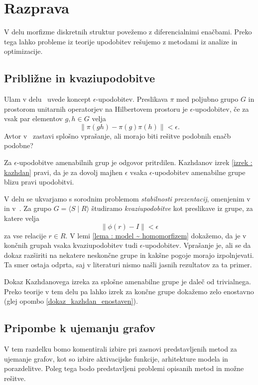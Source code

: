 \documentclass[mat2, tisk]{fmfdelo}
\begin{document}
\section{Razprava}
V delu morfizme diskretnih struktur povežemo z diferencialnimi
enačbami. Preko tega lahko probleme iz teorije upodobitev
rešujemo z metodami iz analize in optimizacije.
\subsection{Približne in kvaziupodobitve}
Ulam v delu~\cite{ulam1960collection} uvede koncept
$\epsilon$-upodobitev. Preslikava $\pi$ med poljubno grupo $G$ in
prostorom unitarnih operatorjev na Hilbertovem prostoru  je
$\epsilon$-upodobitev, če za vsak par elementov $g, h \in G$ velja
$$
\| \pi(gh) -\pi(g)\pi(h)  \| < \epsilon.
$$
Avtor v~\cite[stran 63]{ulam1960collection}
zastavi splošno vprašanje, ali morajo biti rešitve
podobnih enačb podobne?

Za $\epsilon$-upodobitve amenabilnih grup je odgovor pritrdilen.
Kazhdanov izrek \ref{izrek : kazhdan} pravi,
da je za dovolj majhen $\epsilon$ vsaka
$\epsilon$-upodobitev amenabilne grupe blizu pravi upodobitvi.

V delu se ukvarjamo s sorodnim problemom \emph{stabilnosti prezentacij},
omenjenim v
\cite{chapman2023efficientlystablepresentationserrorcorrecting}
in v~\cite{willett2024conditionalrepresentationstabilityclassification}.
Za grupo $G = \langle S \mid R \rangle$ študiramo
\emph{kvaziupodobitve} kot preslikave iz grupe, za katere velja
$$
\left\| \phi(r) - I  \right\| < \epsilon
$$ za
vse relacije $r \in R$.
V lemi \ref{lema : model ~ homomorfizem} dokažemo, da je v
končnih grupah vsaka kvaziupodobitev tudi $\epsilon$-upodobitev.
Vprašanje je, ali se da dokaz razširiti na nekatere neskončne
grupe in kakšne pogoje morajo izpolnjevati.
Ta smer ostaja odprta, saj v literaturi nismo našli jasnih rezultatov
za ta primer.

Dokaz Kazhdanovega izreka za splošne amenabilne grupe je daleč od trivialnega.
Preko teorije v tem delu pa lahko izrek za končne grupe dokažemo zelo
enostavno (glej opombo
\ref{dokaz_kazhdan_enostaven}).
%
%
%
\subsection{Pripombe k ujemanju grafov}
V tem razdelku bomo komentirali izbire pri zasnovi predstavljenih
metod za ujemanje grafov, kot so
izbire aktivacijske funkcije, arhitekture modela in
porazdelitve.
Poleg tega bodo predstavljeni problemi opisanih metod in možne rešitve.
\end{document}
